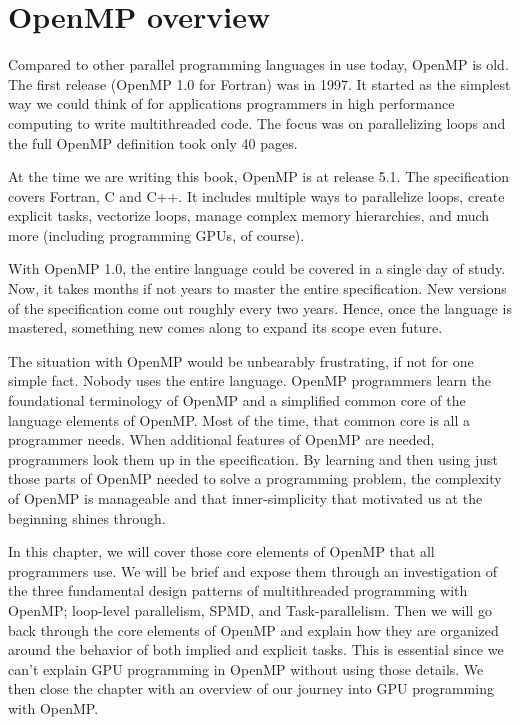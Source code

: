 
\def\ArtDir{02.Overview/figures}%



\chapter[OpenMP overview]{OpenMP overview}
\label{chapter:OMPoverview}

Compared to other parallel programming languages in use today, OpenMP is old.  
The first release (OpenMP 1.0 for Fortran) was in 1997.  
It started as the simplest way we could think of for applications programmers  
in high performance computing to write multithreaded code.  The focus
was on parallelizing loops and the full OpenMP definition took only 40 pages.

At the time we are writing this book, OpenMP is at release 5.1.  The specification covers
Fortran, C and C++.  It includes multiple ways to parallelize loops, create explicit tasks, 
 vectorize loops, manage complex memory hierarchies, and much 
more (including programming GPUs, of course).

With OpenMP 1.0, the entire language could be covered in a single day of study.  Now, it takes months if
not years to master the entire specification.  New versions of the specification come out roughly every 
two years.  Hence, once the language is mastered, something new comes along to expand its scope 
even future.

The situation with OpenMP would be unbearably frustrating, if not for one simple fact.  Nobody
uses the entire language.  OpenMP programmers learn the foundational terminology of OpenMP and 
a simplified common core of the language elements of OpenMP.  Most of the time, that common core
is all a programmer needs.  When additional features of OpenMP are needed, programmers look them up in 
the specification.  By learning and then using just those parts of OpenMP needed to solve a programming 
problem, the complexity of OpenMP is manageable and that inner-simplicity that motivated us at the beginning
shines through.

In this chapter, we will cover those core elements of OpenMP that all programmers use.   We will be brief
and expose them through an investigation of the three fundamental design patterns of multithreaded programming
with OpenMP; loop-level parallelism, SPMD, and Task-parallelism.   Then we will go back through the core
elements of OpenMP and explain how they are organized around the behavior of both implied and explicit tasks.
This is essential since we can't explain GPU programming in OpenMP without using those details.  We 
then close the chapter with an overview of our journey into GPU programming with OpenMP.  

